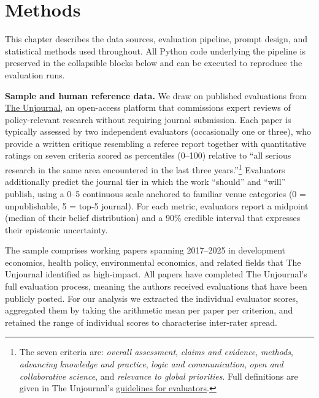\documentclass[
  11pt,
  letterpaper,
]{article}
\begin{document}

\section{Methods}\label{methods}

\small

This chapter describes the data sources, evaluation pipeline, prompt
design, and statistical methods used throughout. All Python code
underlying the pipeline is preserved in the collapsible blocks below and
can be executed to reproduce the evaluation runs.

\textbf{Sample and human reference data.} We draw on published
evaluations from
\href{https://unjournal.github.io/unjournaldata/index.html}{The
Unjournal}, an open-access platform that commissions expert reviews of
policy-relevant research without requiring journal submission. Each
paper is typically assessed by two independent evaluators (occasionally
one or three), who provide a written critique resembling a referee
report together with quantitative ratings on seven criteria scored as
percentiles (0--100) relative to ``all serious research in the same area
encountered in the last three years.''\footnote{The seven criteria are:
  \emph{overall assessment}, \emph{claims and evidence}, \emph{methods},
  \emph{advancing knowledge and practice}, \emph{logic and
  communication}, \emph{open and collaborative science}, and
  \emph{relevance to global priorities}. Full definitions are given in
  The Unjournal's
  \href{https://globalimpact.gitbook.io/the-unjournal-project-and-communication-space/policies-projects-evaluation-workflow/evaluation/guidelines-for-evaluators}{guidelines
  for evaluators}.} Evaluators additionally predict the journal tier in
which the work ``should'' and ``will'' publish, using a 0--5 continuous
scale anchored to familiar venue categories (0 = unpublishable, 5 =
top-5 journal). For each metric, evaluators report a midpoint (median of
their belief distribution) and a 90\% credible interval that expresses
their epistemic uncertainty.

The sample comprises working papers spanning 2017--2025 in development
economics, health policy, environmental economics, and related fields
that The Unjournal identified as high-impact. All papers have completed
The Unjournal's full evaluation process, meaning the authors received
evaluations that have been publicly posted. For our analysis we
extracted the individual evaluator scores, aggregated them by taking the
arithmetic mean per paper per criterion, and retained the range of
individual scores to characterise inter-rater spread.
\end{document}
